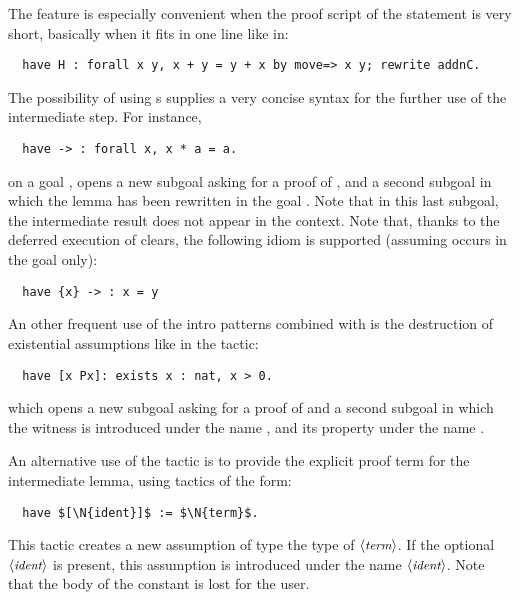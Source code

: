 
The  feature is especially convenient when the proof script of the
statement is very short, basically when it fits in one line like in:
\begin{lstlisting}
  have H : forall x y, x + y = y + x by move=> x y; rewrite addnC.
\end{lstlisting}

The possibility of using \iitem{}s supplies a very concise
syntax for the further use of the intermediate step. For instance,
\begin{lstlisting}
  have -> : forall x, x * a = a.
\end{lstlisting}
on a goal , opens a new subgoal asking for a proof of
, and a second subgoal in which the lemma
  has been rewritten in the goal . Note
 that in this last subgoal, the intermediate result does not appear in
 the context.
Note that, thanks to the deferred execution of clears, the following
idiom is supported (assuming  occurs in the goal only):
\begin{lstlisting}
  have {x} -> : x = y
\end{lstlisting}

An other frequent use of the intro patterns combined with  is the
destruction of existential assumptions like in the tactic:
\begin{lstlisting}
  have [x Px]: exists x : nat, x > 0.
\end{lstlisting}
which opens a new subgoal asking for a proof of  and  a second subgoal in which the witness is introduced under
the name , and its property under the name .

An alternative use of the  tactic is to provide the explicit proof
term for the intermediate lemma, using tactics of the form:
\begin{lstlisting}
  have $[\N{ident}]$ := $\N{term}$.
\end{lstlisting}
This tactic creates a new assumption of type the type of
$\langle\mbox{\itshape\rmfamily\small term}\rangle$. If the
optional $\langle\mbox{\itshape\rmfamily\small ident}\rangle$ is present, this assumption is introduced under
the name $\langle\mbox{\itshape\rmfamily\small ident}\rangle$. Note that the body of the constant is lost for
the user.

